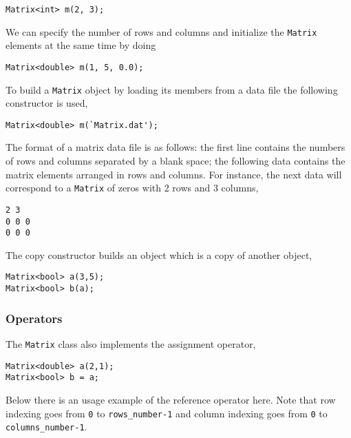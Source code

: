 \begin{lstlisting}
Matrix<int> m(2, 3);
\end{lstlisting}


We can specify the number of rows and columns and initialize the \lstinline"Matrix" elements at the same time by doing

\begin{lstlisting}
Matrix<double> m(1, 5, 0.0);
\end{lstlisting}


To build a \lstinline"Matrix" object by loading its members from a data file the following constructor is used, 

\begin{lstlisting}
Matrix<double> m(`Matrix.dat');
\end{lstlisting}

The format of a matrix data file is as follows: the first line contains the numbers of rows and columns separated by a blank space; the following data contains the matrix elements arranged in rows and columns. For instance, the next data will correspond to a \lstinline"Matrix" of zeros with 2 rows and 3 columns,

\begin{lstlisting}
2 3
0 0 0
0 0 0
\end{lstlisting}


The copy constructor builds an object which is a copy of another object, 

\begin{lstlisting}
Matrix<bool> a(3,5);
Matrix<bool> b(a);
\end{lstlisting}

\subsubsection*{Operators}


The \lstinline"Matrix" class also implements the assignment operator, 


\begin{lstlisting}
Matrix<double> a(2,1);
Matrix<bool> b = a;
\end{lstlisting}


Below there is an usage example of the reference operator here. Note that row indexing goes from \lstinline"0" to
\lstinline"rows_number-1"  and column indexing goes from \lstinline"0" to \lstinline"columns_number-1".

